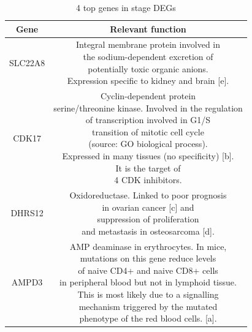 \documentclass[fleqn,10pt]{SelfArx} %
\begin{document}
	\begin{table}[ht]
		\small
		\centering
		\begin{tabular}{cc}
			\hline
			Gene & Relevant function\\
			\hline
			SLC22A8 & \makecell{Integral membrane protein involved in\\the sodium-dependent excretion of\\potentially toxic organic anions.\\Expression specific to kidney and brain [e].}\\
			CDK17 & \makecell{Cyclin-dependent protein \\serine/threonine kinase. Involved in the regulation \\of transcription involved in G1/S\\transition of mitotic cell cycle\\(source: GO biological process).\\Expressed in many tissues (no specificity) [b].\\It is the target of\\4 CDK inhibitors.}\\
			DHRS12 & \makecell{Oxidoreductase. Linked to poor prognosis\\in ovarian cancer [c] and\\suppression of proliferation\\and metastasis in osteosarcoma [d].}\\
			AMPD3 & \makecell{AMP deaminase in erythrocytes. In mice,\\mutations on this gene reduce levels\\of naive CD4+ and naive CD8+ cells\\in peripheral blood but not in lymphoid tissue.\\This is most likely due to a signalling\\mechanism triggered by the mutated\\phenotype of the red blood cells. [a].}\\
			\hline
		\end{tabular}
		\caption{4 top genes in stage DEGs}
		\label{tab:deg_char}
	\end{table}
\end{document}
